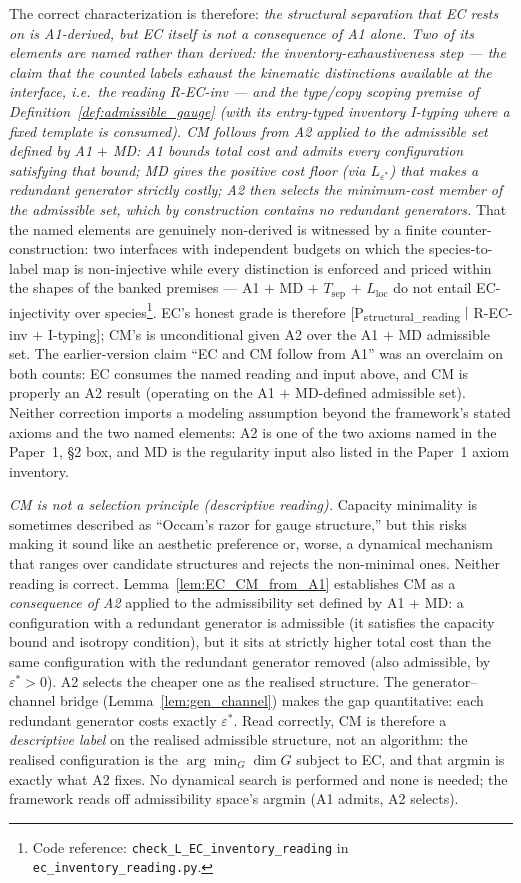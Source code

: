 \documentclass[11pt]{article}
\theoremstyle{definition}
\newcommand{\coderef}[2]{\footnote{Code reference: \texttt{#1} in \texttt{#2}.}}
\begin{document}
The correct characterization is therefore: \emph{the structural
separation that EC rests on is A1-derived, but EC itself is not a
consequence of A1 alone.  Two of its elements are named rather than
derived: the inventory-exhaustiveness step --- the claim that the
counted labels exhaust the kinematic distinctions available at the
interface, i.e.\ the reading R-EC-inv --- and the type/copy scoping
premise of Definition~\ref{def:admissible_gauge} (with its
entry-typed inventory I-typing where a fixed template is consumed).
CM follows from A2
applied to the admissible set defined by A1 $+$ MD: A1 bounds total
cost and admits every configuration satisfying that bound; MD gives
the positive cost floor (via $L_{\varepsilon^*}$) that makes a
redundant generator strictly costly; A2 then selects the minimum-cost
member of the admissible set, which by construction contains no
redundant generators.}  That the named elements are genuinely
non-derived is witnessed by a finite counter-construction: two
interfaces with independent budgets on which the species-to-label map
is non-injective while every distinction is enforced and priced within
the shapes of the banked premises --- A1 $+$ MD $+$ $T_{\mathrm{sep}}$
$+$ $L_{\mathrm{loc}}$ do not entail EC-injectivity over
species\coderef{check\_L\_EC\_inventory\_reading}{ec\_inventory\_reading.py}.
EC's honest grade is therefore
[P\textsubscript{structural\_reading} $\mid$ R-EC-inv $+$ I-typing];
CM's is unconditional given A2 over the A1 $+$ MD admissible set.
The earlier-version claim ``EC and CM follow
from A1'' was an overclaim on both counts: EC consumes the named
reading and input above, and
CM is properly an A2 result (operating on the A1 $+$ MD-defined
admissible set).  Neither correction imports a modeling assumption
beyond the framework's stated axioms and the two named elements: A2 is
one of the two axioms
named in the Paper~1, \S2 box, and MD is the regularity input also
listed in the Paper~1 axiom inventory.

\smallskip\noindent\textit{CM is not a selection principle (descriptive
reading).}\quad
Capacity minimality is sometimes described as ``Occam's razor for gauge
structure,'' but this risks making it sound like an aesthetic preference
or, worse, a dynamical mechanism that ranges over candidate structures
and rejects the non-minimal ones.  Neither reading is correct.
Lemma~\ref{lem:EC_CM_from_A1} establishes CM as a \emph{consequence
of A2} applied to the admissibility set defined by A1 $+$ MD: a
configuration with a redundant generator is admissible (it satisfies
the capacity bound and isotropy condition), but it sits at strictly
higher total cost than the same configuration with the redundant
generator removed (also admissible, by $\varepsilon^* > 0$).  A2
selects the cheaper one as the realised structure.  The
generator--channel bridge (Lemma~\ref{lem:gen_channel}) makes the
gap quantitative: each redundant generator costs exactly
$\varepsilon^*$.  Read correctly, CM is therefore a \emph{descriptive
label} on the realised admissible structure, not an algorithm: the
realised configuration is the $\arg\min_G \dim G$ subject to EC, and
that argmin is exactly what A2 fixes.  No dynamical search is
performed and none is needed; the framework reads off admissibility
space's argmin (A1 admits, A2 selects).
\end{document}
